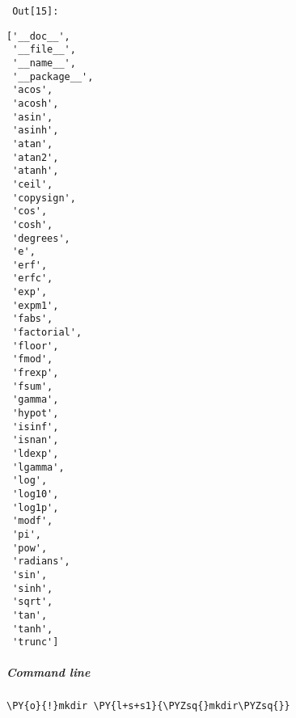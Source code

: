        {\par%
        \vspace{-1\smallerfontscale}%
        \noindent%
        \begin{minipage}{\cellleftmargin}%
    \hfill%
    {\smaller%
    \tt%
    \color{nbframe-out-prompt}%
    Out[15]:}%
    \hspace{\inputpadding}%
    \hspace{0em}%
    \hspace{3pt}%
    \end{minipage}%
        }%
    \begin{addmargin}[\cellleftmargin]{0em}%
    {\smaller%
    \vspace{-1\smallerfontscale}%
    
    
    
    \begin{verbatim}
['__doc__',
 '__file__',
 '__name__',
 '__package__',
 'acos',
 'acosh',
 'asin',
 'asinh',
 'atan',
 'atan2',
 'atanh',
 'ceil',
 'copysign',
 'cos',
 'cosh',
 'degrees',
 'e',
 'erf',
 'erfc',
 'exp',
 'expm1',
 'fabs',
 'factorial',
 'floor',
 'fmod',
 'frexp',
 'fsum',
 'gamma',
 'hypot',
 'isinf',
 'isnan',
 'ldexp',
 'lgamma',
 'log',
 'log10',
 'log1p',
 'modf',
 'pi',
 'pow',
 'radians',
 'sin',
 'sinh',
 'sqrt',
 'tan',
 'tanh',
 'trunc']
    \end{verbatim}

    
}%
    \end{addmargin}%

    \subparagraph{Command line}



{\par%
\vspace{-1\baselineskip}%
}%
\begin{notebookcell}[24]%
\begin{addmargin}[\cellleftmargin]{0em}%
{\smaller%
\par%
%
\vspace{-1\smallerfontscale}%
\begin{Verbatim}[commandchars=\\\{\}]
\PY{o}{!}mkdir \PY{l+s+s1}{\PYZsq{}mkdir\PYZsq{}}
\end{Verbatim}
%
\par%
\vspace{-1\smallerfontscale}}%
\end{addmargin}
\end{notebookcell}


